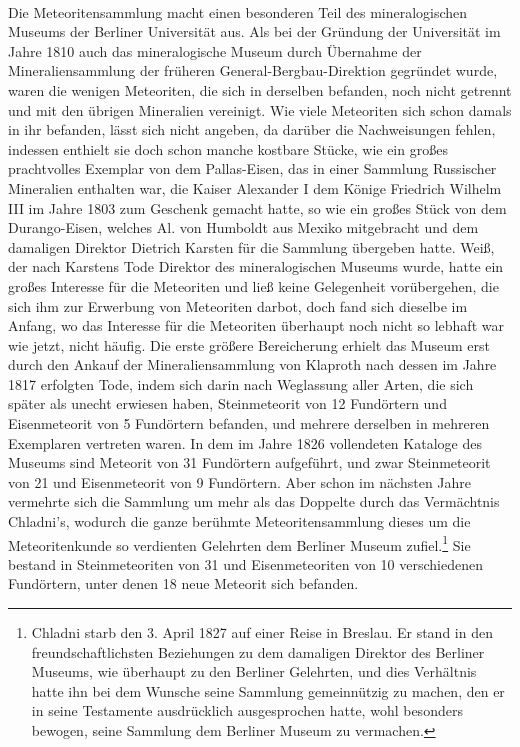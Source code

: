 \documentclass[a4paper, 11pt, oneside]{article}
\begin{document}
\paragraph{}
Die Meteoritensammlung macht einen besonderen Teil des mineralogischen Museums der Berliner Universität aus. Als bei der Gründung der Universität im Jahre 1810 auch das mineralogische Museum durch Übernahme der Mineraliensammlung der früheren General-Bergbau-Direktion gegründet wurde, waren die wenigen Meteoriten, die sich in derselben befanden, noch nicht getrennt und mit den übrigen Mineralien vereinigt. Wie viele Meteoriten sich schon damals in ihr befanden, lässt sich nicht angeben, da darüber die Nachweisungen fehlen, indessen enthielt sie doch schon manche kostbare Stücke, wie ein großes prachtvolles Exemplar von dem Pallas-Eisen, das in einer Sammlung Russischer Mineralien enthalten war, die Kaiser Alexander I dem Könige Friedrich Wilhelm III im Jahre 1803 zum Geschenk gemacht hatte, so wie ein großes Stück von dem Durango-Eisen, welches Al. von Humboldt aus Mexiko mitgebracht und dem damaligen Direktor Dietrich Karsten für die Sammlung übergeben hatte. Weiß, der nach Karstens Tode Direktor des mineralogischen Museums wurde, hatte ein großes Interesse für die Meteoriten und ließ keine Gelegenheit vorübergehen, die sich ihm zur Erwerbung von Meteoriten darbot, doch fand sich dieselbe im Anfang, wo das Interesse für die Meteoriten überhaupt noch nicht so lebhaft war wie jetzt, nicht häufig. Die erste größere Bereicherung erhielt das Museum erst durch den Ankauf der Mineraliensammlung von Klaproth nach dessen im Jahre 1817 erfolgten Tode, indem sich darin nach Weglassung aller Arten, die sich später als unecht erwiesen haben, Steinmeteorit von 12 Fundörtern und Eisenmeteorit von 5 Fundörtern befanden, und mehrere derselben in mehreren Exemplaren vertreten waren. In dem im Jahre 1826 vollendeten Kataloge des Museums sind Meteorit von 31 Fundörtern aufgeführt, und zwar Steinmeteorit von 21 und Eisenmeteorit von 9 Fundörtern. Aber schon im nächsten Jahre vermehrte sich die Sammlung um mehr als das Doppelte durch das Vermächtnis Chladni's, wodurch die ganze berühmte Meteoritensammlung dieses um die Meteoritenkunde so verdienten Gelehrten dem Berliner Museum zufiel.\footnote{Chladni starb den 3. April 1827 auf einer Reise in Breslau. Er stand in den freundschaftlichsten Beziehungen zu dem damaligen Direktor des Berliner Museums, wie überhaupt zu den Berliner Gelehrten, und dies Verhältnis hatte ihn bei dem Wunsche seine Sammlung gemeinnützig zu machen, den er in seine Testamente ausdrücklich ausgesprochen hatte, wohl besonders bewogen, seine Sammlung dem Berliner Museum zu vermachen.} Sie bestand in Steinmeteoriten von 31 und Eisenmeteoriten von 10 verschiedenen Fundörtern, unter denen 18 neue Meteorit sich befanden.
\end{document}
